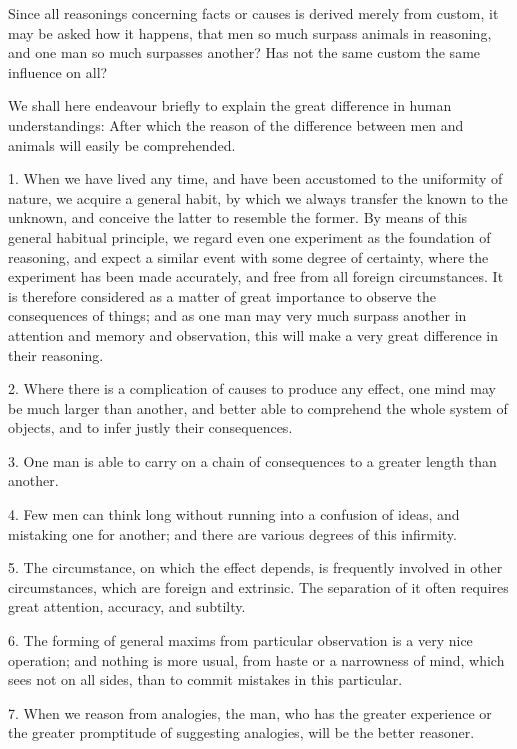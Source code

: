 \documentclass[]{article}
\begin{document}
\begin{sectionbody}
\medskip
{}

Since all reasonings concerning facts or causes is derived merely from custom, it may be asked how it happens, that men so much surpass animals in reasoning, and one man so much surpasses another? Has not the same custom the same influence on all?

We shall here endeavour briefly to explain the great difference in human understandings: After which the reason of the difference between men and animals will easily be comprehended.

1. When we have lived any time, and have been accustomed to the uniformity of nature, we acquire a general habit, by which we always transfer the known to the unknown, and conceive the latter to resemble the former. By means of this general habitual principle, we regard even one experiment as the foundation of reasoning, and expect a similar event with some degree of certainty, where the experiment has been made accurately, and free from all foreign circumstances. It is therefore considered as a matter of great importance to observe the consequences of things; and as one man may very much surpass another in attention and memory and observation, this will make a very great difference in their reasoning.

2. Where there is a complication of causes to produce any effect, one mind may be much larger than another, and better able to comprehend the whole system of objects, and to infer justly their consequences.

3. One man is able to carry on a chain of consequences to a greater length than another.

4. Few men can think long without running into a confusion of ideas, and mistaking one for another; and there are various degrees of this infirmity.

5. The circumstance, on which the effect depends, is frequently involved in other circumstances, which are foreign and extrinsic. The separation of it often requires great attention, accuracy, and subtilty.

6. The forming of general maxims from particular observation is a very nice operation; and nothing is more usual, from haste or a narrowness of mind, which sees not on all sides, than to commit mistakes in this particular.

7. When we reason from analogies, the man, who has the greater experience or the greater promptitude of suggesting analogies, will be the better reasoner.


\end{sectionbody}
\end{document}
